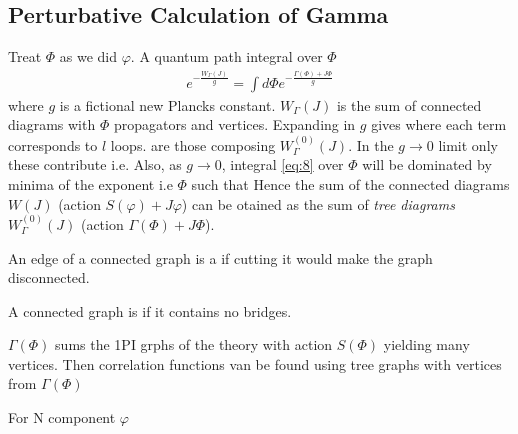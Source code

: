 \documentclass{article}
\begin{document}
\subsection{Perturbative Calculation of Gamma}
Treat $\Phi$ as we did $\varphi$. A quantum path integral over $\Phi$
\begin{align} \label{eq:8}
e^{-\frac{W_\Gamma(J)}{g}} = \int d\Phi e^{-\frac{\Gamma(\Phi)+J\Phi}{g}}
\end{align}
where $g$ is a fictional new Plancks constant. $W_\Gamma(J)$ is the sum of connected diagrams with $\Phi$ propagators and vertices. Expanding in $g$ gives 
where each term corresponds to $l$ loops.  are those composing $W^{(0)}_\Gamma(J)$. In the $g\to 0$ limit only these contribute i.e. 
Also, as $g\to 0 $, integral \ref{eq:8} over $\Phi$ will be dominated by minima of the exponent i.e $\Phi$ such that 
Hence the sum of the connected diagrams $W(J)$ (action $S(\varphi)+J\varphi$) can be otained as the sum of \emph{tree diagrams} $W_\Gamma^{(0)}(J)$ (action $\Gamma(\Phi)+J\Phi$). 

\begin{definition}[Bridge]
An edge of a connected graph is a  if cutting it would make the graph disconnected. 
\end{definition}

\begin{definition}
A connected graph is  if it contains no bridges. 
\end{definition}

$\Gamma(\Phi)$ sums the 1PI grphs of the theory with action $S(\Phi)$ yielding many vertices. Then correlation functions van be found using tree graphs with vertices from $\Gamma(\Phi)$

\begin{example}
For N component $\varphi$ 
\end{example}
\end{document}
